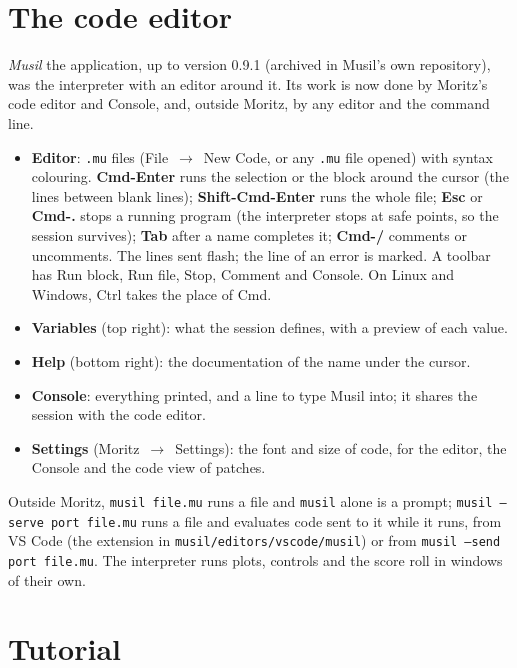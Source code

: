 \documentclass[11pt,a4paper]{article}
\begin{document}
\section{The code editor}
\label{sec:ide}

\textit{Musil} the application, up to version 0.9.1 (archived in Musil's own repository), was
the interpreter with an editor around it. Its work is now done by Moritz's code editor and
Console, and, outside Moritz, by any editor and the command line.

\begin{itemize}[nosep]
  \item \textbf{Editor}: \texttt{.mu} files (File~$\to$~New Code, or any \texttt{.mu} file
        opened) with syntax colouring. \textbf{Cmd-Enter} runs the selection or the block
        around the cursor (the lines between blank lines); \textbf{Shift-Cmd-Enter} runs the
        whole file; \textbf{Esc} or \textbf{Cmd-.} stops a running program (the interpreter
        stops at safe points, so the session survives); \textbf{Tab} after a name completes
        it; \textbf{Cmd-/} comments or uncomments. The lines sent flash; the line of an error
        is marked. A toolbar has Run block, Run file, Stop, Comment and Console. On Linux and
        Windows, Ctrl takes the place of Cmd.
  \item \textbf{Variables} (top right): what the session defines, with a preview of each value.
  \item \textbf{Help} (bottom right): the documentation of the name under the cursor.
  \item \textbf{Console}: everything printed, and a line to type Musil into; it shares the
        session with the code editor.
  \item \textbf{Settings} (Moritz~$\to$~Settings): the font and size of code, for the editor, the
        Console and the code view of patches.
\end{itemize}

Outside Moritz, \texttt{musil file.mu} runs a file and \texttt{musil} alone is a prompt;
\texttt{musil --serve port file.mu} runs a file and evaluates code sent to it while it runs,
from VS Code (the extension in \texttt{musil/editors/vscode/musil}) or from
\texttt{musil --send port file.mu}. The interpreter runs plots, controls and the score roll in
windows of their own.

\section{Tutorial}
\label{sec:tutorial}
\end{document}
